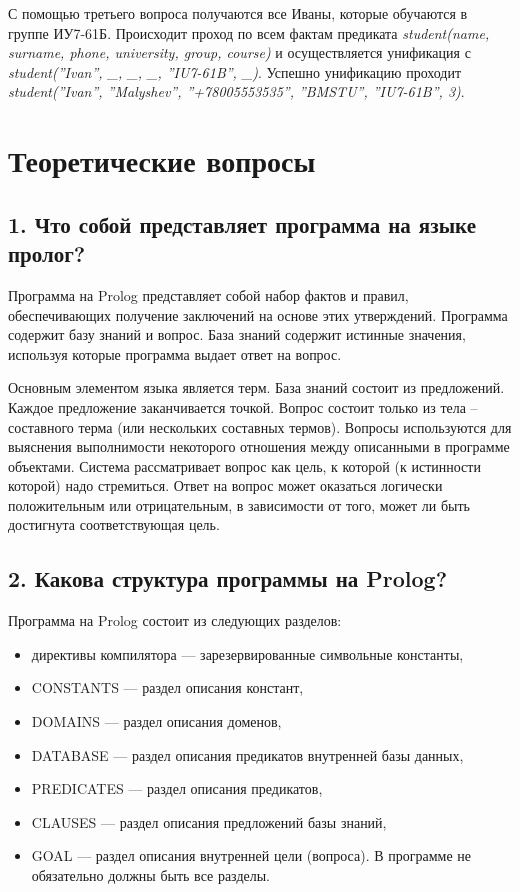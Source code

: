 \documentclass[12pt]{report}
\begin{document}
С помощью третьего вопроса получаются все Иваны, которые обучаются в группе ИУ7-61Б.  Происходит проход по всем фактам предиката \emph{student(name, surname, phone, university, group, course)} и осуществляется унификация с \emph{student(''Ivan'', \_, \_, \_, ''IU7-61B'', \_)}.  Успешно унификацию проходит \emph{student(''Ivan'', ''Malyshev'', ''+78005553535'', ''BMSTU'', ''IU7-61B'', 3)}.\\

\chapter*{Теоретические вопросы}

\section*{1. Что собой представляет программа на языке пролог?}

Программа на Prolog представляет собой набор фактов и правил, обеспечивающих получение заключений на основе этих утверждений. Программа содержит базу знаний и вопрос. База знаний содержит истинные значения, используя которые программа выдает ответ на вопрос. 

Основным элементом языка является терм. База знаний состоит из предложений. Каждое предложение заканчивается точкой. Вопрос состоит только из тела – составного терма (или нескольких составных термов). Вопросы используются для выяснения выполнимости некоторого отношения между описанными в программе объектами. Система рассматривает вопрос как цель, к которой (к истинности которой) надо стремиться. Ответ на вопрос может оказаться логически положительным или отрицательным, в зависимости от того, может ли быть достигнута соответствующая цель.

\section*{2. Какова структура программы на Prolog?}

Программа на Prolog состоит из следующих разделов:

\begin{itemize}
	\item директивы компилятора — зарезервированные символьные константы,
	\item CONSTANTS — раздел описания констант,
	\item DOMAINS — раздел описания доменов,
	\item DATABASE — раздел описания предикатов внутренней базы данных,
	\item PREDICATES — раздел описания предикатов,
	\item CLAUSES — раздел описания предложений базы знаний,
	\item GOAL — раздел описания внутренней цели (вопроса).
	В программе не обязательно должны быть все разделы.
\end{itemize}
\end{document}
